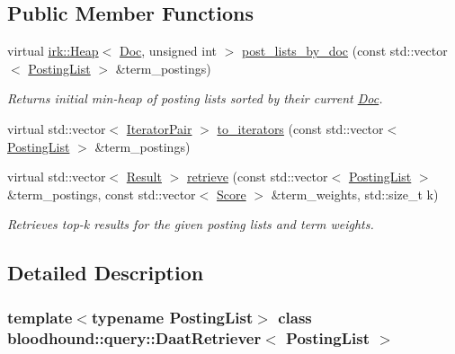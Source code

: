 \subsection*{Public Member Functions}
\begin{DoxyCompactItemize}
\item 
virtual \mbox{\hyperlink{classirk_1_1Heap}{irk\+::\+Heap}}$<$ \mbox{\hyperlink{structbloodhound_1_1Doc}{Doc}}, unsigned int $>$ \mbox{\hyperlink{classbloodhound_1_1query_1_1DaatRetriever_a6c292b0ca9feb30dbdb3a2799a34b3e5}{post\+\_\+lists\+\_\+by\+\_\+doc}} (const std\+::vector$<$ \mbox{\hyperlink{classbloodhound_1_1PostingList}{Posting\+List}} $>$ \&term\+\_\+postings)
\begin{DoxyCompactList}\small\item\em Returns initial min-\/heap of posting lists sorted by their current \mbox{\hyperlink{structbloodhound_1_1Doc}{Doc}}. \end{DoxyCompactList}\item 
virtual std\+::vector$<$ \mbox{\hyperlink{structbloodhound_1_1query_1_1DaatRetriever_1_1IteratorPair}{Iterator\+Pair}} $>$ \mbox{\hyperlink{classbloodhound_1_1query_1_1DaatRetriever_a5b10288f90a4fc4d89f56971bdc48363}{to\+\_\+iterators}} (const std\+::vector$<$ \mbox{\hyperlink{classbloodhound_1_1PostingList}{Posting\+List}} $>$ \&term\+\_\+postings)
\item 
virtual std\+::vector$<$ \mbox{\hyperlink{structbloodhound_1_1query_1_1Result}{Result}} $>$ \mbox{\hyperlink{classbloodhound_1_1query_1_1DaatRetriever_ab80b4867fc263827dc2fdbe0965a2e8c}{retrieve}} (const std\+::vector$<$ \mbox{\hyperlink{classbloodhound_1_1PostingList}{Posting\+List}} $>$ \&term\+\_\+postings, const std\+::vector$<$ \mbox{\hyperlink{structbloodhound_1_1Score}{Score}} $>$ \&term\+\_\+weights, std\+::size\+\_\+t k)
\begin{DoxyCompactList}\small\item\em Retrieves top-\/k results for the given posting lists and term weights. \end{DoxyCompactList}\end{DoxyCompactItemize}


\subsection{Detailed Description}
\subsubsection*{template$<$typename Posting\+List$>$\newline
class bloodhound\+::query\+::\+Daat\+Retriever$<$ Posting\+List $>$}

